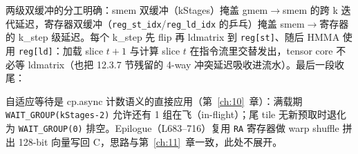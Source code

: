 



两级双缓冲的分工明确：smem 双缓冲（kStages）掩盖 gmem$\to$smem
的跨 k 迭代延迟，寄存器双缓冲（\texttt{reg\_st\_idx}/\texttt{reg\_ld\_idx}
的乒乓）掩盖 smem$\to$寄存器的 k\_step 级延迟。每个 k\_step 先 flip 再
ldmatrix 到 \texttt{reg[st]}、随后 HMMA 使用 \texttt{reg[ld]}：加载 slice $t{+}1$
与计算 slice $t$ 在指令流里交替发出，tensor core 不必等 ldmatrix（也把
12.3.7 节残留的 4-way 冲突延迟吸收进流水）。最后一段收尾：



自适应等待是 cp.async 计数语义的直接应用（第~\ref{ch:10}~章）：满载期
\texttt{WAIT\_\allowbreak{}GROUP\allowbreak{}(k\allowbreak{}Stages-2)} 允许还有 1 组在飞（in-flight）；尾 tile 无新预取时退化为
\texttt{WAIT\_\allowbreak{}GROUP\allowbreak{}(0)} 排空。Epilogue（L683--716）复用 \texttt{RA} 寄存器做
warp shuffle 拼出 128-bit 向量写回 C，思路与第~\ref{ch:11}~章一致，此处不展开。

